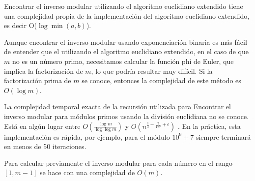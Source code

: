 Encontrar el inverso modular utilizando el algoritmo euclidiano extendido tiene una complejidad propia de la implementación del algoritmo euclidiano extendido, es decir  O($\log \min(a,b)$).

Aunque encontrar el inverso modular usando exponenciación binaria es más fácil de entender que el 
utilizando el algoritmo euclidiano extendido, en el caso de que $m$ no es un número primo, necesitamos 
calcular la función phi de Euler, que implica la factorización de $m$, lo que podría resultar muy 
difícil. Si la factorización prima de $m$ se conoce, entonces la complejidad de este método es $O(\log m)$.

La complejidad temporal exacta de la recursión utilizada para Encontrar el inverso modular para módulos primos usando la división euclidiana no se conoce. Está en algún lugar entre $O(\frac{\log m}{\log\log m})$ y $O(n^{\frac{1}{3} - \frac{2}{177} + \epsilon})$ . En la práctica, esta implementación es rápida, por ejemplo, para el módulo $10^9 + 7$ siempre terminará en menos de 50 iteraciones.

Para calcular previamente el inverso modular para cada número en el rango $[1,m-1]$ se hace con una complejidad de $O(m)$.